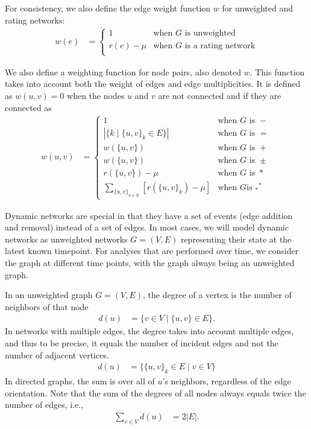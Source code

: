 \documentclass{article}
\begin{document}
For consistency, we also
define the edge weight function $w$ for unweighted and rating networks: 
\begin{align}
  w(e) &= \left\{ \begin{array}{ll} 
    1 & \text{when $G$ is unweighted} \\
    r(e)-\mu & \text{when $G$ is a rating network} \\
    \end{array} \right. 
\end{align}

We also define a weighting function for node pairs, also denoted
$w$. This function takes into account both the weight of edges and edge
multiplicities. It is defined as $w(u,v)=0$ when the nodes $u$ and $v$ are
not connected and if they are connected as
\begin{align}
  w(u,v) &= \left\{ \begin{array}{ll}
    1 & \text{when $G$ is $-$} \\
    |\{k \mid \{u,v\}_k \in E\}| & \text{when $G$ is $=$} \\
    w(\{u,v\}) & \text{when $G$ is $+$}
    \\
    w(\{u,v\}) & \text{when $G$ is $\pm$} \\
    r(\{u,v\}) - \mu & \text{when $G$ is $*$} \\
    \sum_{\{u,v\}_{k\in E}} [r(\{u,v\}_k) - \mu] & \text{when $G$
      is $_*{}^*$}
    \end{array} \right. 
\end{align}

Dynamic networks are special in that they have a set of events (edge
addition and removal) instead of a set of edges.  In most cases, we will
model dynamic networks as unweighted networks $G=(V,E)$ representing
their state at the latest known timepoint.  For analyses that are
performed over time, we consider the graph at different time points,
with the graph always being an unweighted graph. 

In an unweighted graph $G=(V,E)$, the degree of a vertex is the number
of neighbors of that node
\begin{align}
  d(u) &= \{ v \in V \mid \{u,v\} \in E \}. 
\end{align}
In networks with multiple edges, the degree takes into account multiple
edges, and thus to be precise, it equals the number of incident edges
and not the number of adjacent vertices. 
\begin{align}
  d(u) &= \{ \{u,v\}_k \in E \mid v \in V \}
\end{align}
In directed graphs, the sum is over all of $u$'s neighbors, regardless
of the edge orientation. 
Note that the sum of the degrees of all nodes always equals twice the
number of edges, i.e.,
\begin{align}
  \sum_{v\in V} d(u) &= 2|E|. 
\end{align}
\end{document}
